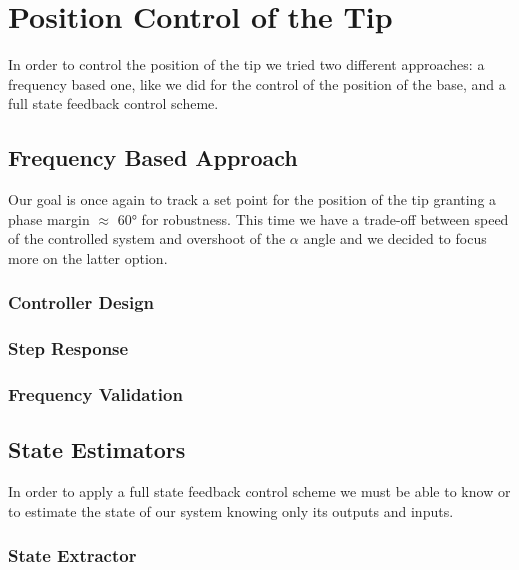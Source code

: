 \chapter{Position Control of the Tip}
\label{cha:position_tip}

In order to control the position of the tip we tried two different approaches: a frequency based one, like we did for the control of the position of the base, and a full state feedback control scheme.

\section{Frequency Based Approach}

Our goal is once again to track a set point for the position of the tip granting a phase margin $\approx$ 60° for robustness. This time we have a trade-off between speed of the controlled system and overshoot of the $\alpha$ angle and we decided to focus more on the latter option.

\subsection{Controller Design}


\subsection{Step Response}


\subsection{Frequency Validation}


\section{State Estimators}

In order to apply a full state feedback control scheme we must be able to know or to estimate the state of our system knowing only its outputs and inputs.

\subsection{State Extractor}

